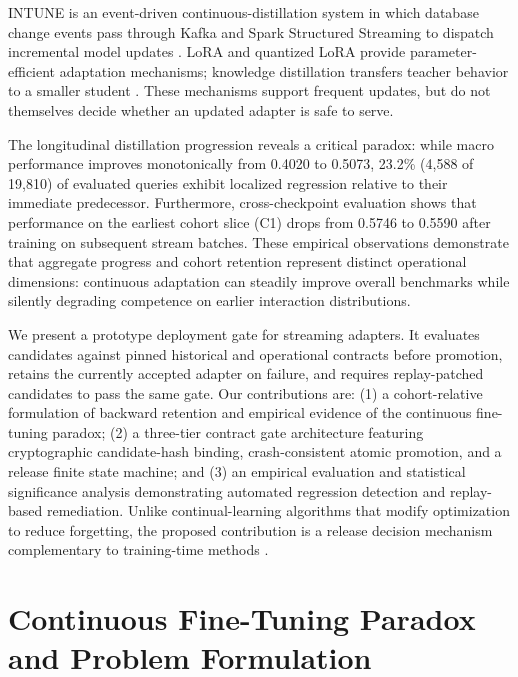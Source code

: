 \documentclass[conference]{IEEEtran}
\begin{document}
INTUNE is an event-driven continuous-distillation system in which database change events pass through Kafka and Spark Structured Streaming to dispatch incremental model updates \cite{bharuka2026intune,kreps2011kafka,180560}. LoRA and quantized LoRA provide parameter-efficient adaptation mechanisms; knowledge distillation transfers teacher behavior to a smaller student \cite{hu2022yelong,NEURIPS2023_1feb8787,hinton2015distilling}. These mechanisms support frequent updates, but do not themselves decide whether an updated adapter is safe to serve.

The longitudinal distillation progression reveals a critical paradox: while macro performance improves monotonically from 0.4020 to 0.5073, 23.2\% (4,588 of 19,810) of evaluated queries exhibit localized regression relative to their immediate predecessor. Furthermore, cross-checkpoint evaluation shows that performance on the earliest cohort slice (C1) drops from 0.5746 to 0.5590 after training on subsequent stream batches. These empirical observations demonstrate that aggregate progress and cohort retention represent distinct operational dimensions: continuous adaptation can steadily improve overall benchmarks while silently degrading competence on earlier interaction distributions.

We present a prototype deployment gate for streaming adapters. It evaluates candidates against pinned historical and operational contracts before promotion, retains the currently accepted adapter on failure, and requires replay-patched candidates to pass the same gate. Our contributions are: (1) a cohort-relative formulation of backward retention and empirical evidence of the continuous fine-tuning paradox; (2) a three-tier contract gate architecture featuring cryptographic candidate-hash binding, crash-consistent atomic promotion, and a release finite state machine; and (3) an empirical evaluation and statistical significance analysis demonstrating automated regression detection and replay-based remediation. Unlike continual-learning algorithms that modify optimization to reduce forgetting, the proposed contribution is a release decision mechanism complementary to training-time methods \cite{NIPS2017_f8752278,kirkpatrick2017overcoming,8107520}.

\section{Continuous Fine-Tuning Paradox and Problem Formulation}
\end{document}
